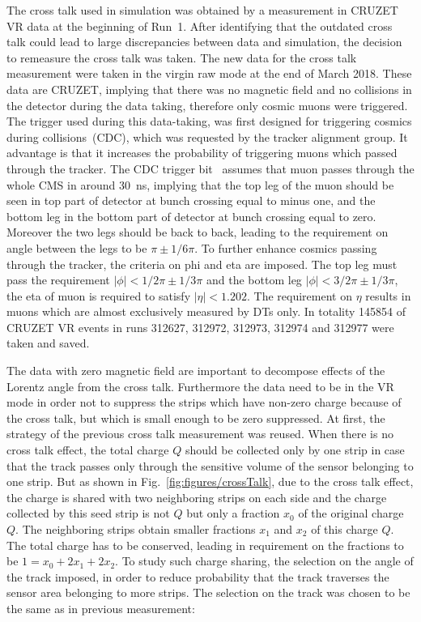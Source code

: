 The cross talk used in simulation was obtained by a measurement in CRUZET VR data at the beginning of Run~1. After identifying that the outdated cross talk could lead to large discrepancies between data and simulation, the decision  to remeasure the cross talk was taken. The new data for the cross talk measurement were taken in the virgin raw mode at the end of March 2018. These data are CRUZET, implying that there was no magnetic field and no collisions in the detector during the data taking, therefore only cosmic muons were triggered. The trigger used during this data-taking, was first designed for triggering cosmics during collisions~(CDC), which was requested by the tracker alignment group. It advantage is that it increases the probability of triggering muons which passed through the tracker. The CDC trigger bit~\cite{website:trigger} assumes that muon passes through the whole CMS in around 30~ns, implying that the top leg of the muon should be seen in top part of detector at bunch crossing equal to minus one, and the bottom leg in the bottom part of detector at bunch crossing equal to zero. Moreover the two legs should be back to back, leading to the requirement on angle between the legs to be $\pi \pm 1/6\pi$. To further enhance cosmics passing through the tracker, the criteria on phi and eta are imposed. The top leg must pass the requirement $|\phi|<1/2\pi \pm 1/3\pi$ and the bottom leg $|\phi|<3/2\pi \pm 1/3\pi$, the eta of muon is required to satisfy $|\eta|<1.202$. The requirement on $\eta$ results in muons which are almost exclusively measured by DTs only. In totality 145854 of CRUZET VR events in runs 312627, 312972, 312973, 312974 and 312977 were taken and saved.

The data with zero magnetic field are important to decompose effects of the Lorentz angle from the cross talk. Furthermore the data need to be in the VR mode in order not to suppress the strips which have non-zero charge because of the cross talk, but which is small enough to be zero suppressed. At first, the strategy of the previous cross talk measurement was reused. When there is no cross talk effect, the total charge $Q$ should be collected only by one strip in case that the track passes only through the sensitive volume of the sensor belonging to one strip. But as shown in Fig.~\ref{fig:figures/crossTalk}, due to the cross talk effect, the charge is shared with two neighboring strips on each side and the charge collected by this seed strip is not $Q$ but only a fraction $x_{0}$ of the original charge $Q$. The neighboring strips obtain smaller fractions $x_{1}$ and $x_{2}$ of this charge $Q$. The total charge has to be conserved, leading in requirement on the fractions to be $1=x_{0}+2x_{1}+2x_{2}$. To study such charge sharing, the selection on the angle of the track imposed, in order to reduce probability that the track traverses the sensor area belonging to more strips. The selection on the track was chosen to be the same as in previous measurement:

